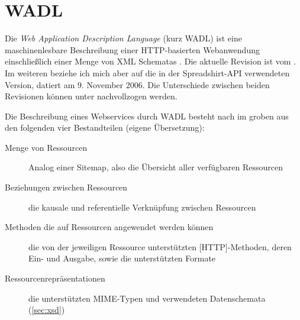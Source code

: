\section{WADL}
\label{sec:wadl}

Die \emph{Web Application Description Language} (kurz \gls{WADL}) ist eine maschinenlesbare Beschreibung einer \gls{HTTP}-basierten Webanwendung einschließlich einer Menge von \gls{XML} Schematas \cite{hadleyWADL}.
Die aktuelle Revision ist vom  \cite{WADLcurrent}. Im weiteren beziehe ich mich aber auf die in der Spreadshirt-\gls{API} verwendeten Version, datiert am 9. November 2006. Die Unterschiede zwischen beiden Revisionen können unter \cite{WADLchanges} nachvollzogen werden.

Die Beschreibung eines Webservices durch \gls{WADL} besteht nach \cite{hadleyWADL} im groben aus den folgenden vier Bestandteilen (eigene Übersetzung):
\begin{description}
     \item[Menge von Ressourcen] Analog einer Sitemap, also die Übersicht aller verfügbaren Ressourcen
     \item[Beziehungen zwischen Ressourcen] die kausale und referentielle Verknüpfung zwischen Ressourcen
     \item[Methoden die auf Ressourcen angewendet werden können] die von der jeweiligen Ressource unterstützten [\gls{HTTP}]-Methoden, deren Ein- und Ausgabe, sowie die unterstützten Formate
     \item[Ressourcenrepräsentationen] die unterstützten \gls{MIME}-Typen und verwendeten Datenschemata (\cref{sec:xsd})
\end{description} 

\newpage


